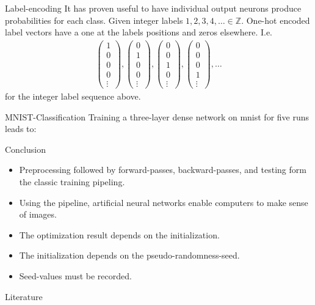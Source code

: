 \documentclass[notes]{beamer}
\begin{document}
    \begin{frame}{Label-encoding}
      It has proven useful to have individual output neurons produce probabilities for each class.
      Given integer labels $1,2,3,4, \dots \in \mathbb{Z}$. One-hot encoded label vectors have a one 
      at the labels positions and zeros elsewhere. I.e.
      \begin{align}
        \begin{pmatrix}
          1 \\ 0 \\ 0 \\ 0 \\ \vdots
        \end{pmatrix},
        \begin{pmatrix}
          0 \\ 1 \\ 0 \\ 0 \\\vdots
        \end{pmatrix},
        \begin{pmatrix}
          0 \\ 0 \\ 1 \\ 0 \\\vdots
        \end{pmatrix},
        \begin{pmatrix}
          0 \\ 0 \\ 0 \\ 1 \\\vdots
        \end{pmatrix},
        \dots
      \end{align}
      for the integer label sequence above.
    \end{frame}

    \begin{frame}{MNIST-Classification}
      Training a three-layer dense network on mnist for five runs leads to:
      \begin{figure}
        
      \end{figure}
    \end{frame}

    \begin{frame}{Conclusion}
      \begin{itemize}
        \item Preprocessing followed by forward-passes, backward-passes, and testing form the classic training pipeling.
        \item Using the pipeline, artificial neural networks enable computers to make sense of images.
        \item The optimization result depends on the initialization.
        \item The initialization depends on the pseudo-randomness-seed.
        \item Seed-values must be recorded.
      \end{itemize}
    \end{frame}

    \begin{frame}[allowframebreaks]{Literature}
      \printbibliography
    \end{frame}
\end{document}
